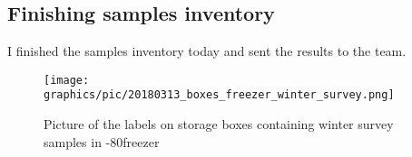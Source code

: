\subsection{Finishing samples inventory}
\label{task:20180313_cj3}

I finished the samples inventory today and sent the results to the team.

\begin{figure}[H] %
    \centering
    \caption{Picture of the labels on storage boxes containing winter survey samples in -80\degree freezer}
    \label{fig:20180313_boxes_freezer_winter_survey}
    \texttt{[image: graphics/pic/20180313\_boxes\_freezer\_winter\_survey.png]}
\end{figure}